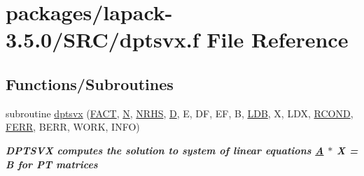 \hypertarget{dptsvx_8f}{}\section{packages/lapack-\/3.5.0/\+S\+R\+C/dptsvx.f File Reference}
\label{dptsvx_8f}
\subsection*{Functions/\+Subroutines}
\begin{DoxyCompactItemize}
\item 
subroutine \hyperlink{group__doublePTsolve_ga9584fd037291be2dff42741bb3215772}{dptsvx} (\hyperlink{superlu__enum__consts_8h_af00a42ecad444bbda75cde1b64bd7e72a1b6692b56d378abb85bd49063721d034}{F\+A\+C\+T}, \hyperlink{polmisc_8c_a0240ac851181b84ac374872dc5434ee4}{N}, \hyperlink{example__user_8c_aa0138da002ce2a90360df2f521eb3198}{N\+R\+H\+S}, \hyperlink{odrpack_8h_a7dae6ea403d00f3687f24a874e67d139}{D}, E, D\+F, E\+F, B, \hyperlink{example__user_8c_a50e90a7104df172b5a89a06c47fcca04}{L\+D\+B}, X, L\+D\+X, \hyperlink{superlu__enum__consts_8h_af00a42ecad444bbda75cde1b64bd7e72a9b5c151728d8512307565994c89919d5}{R\+C\+O\+N\+D}, \hyperlink{superlu__enum__consts_8h_af00a42ecad444bbda75cde1b64bd7e72a78fd14d7abebae04095cfbe02928f153}{F\+E\+R\+R}, B\+E\+R\+R, W\+O\+R\+K, I\+N\+F\+O)
\begin{DoxyCompactList}\small\item\em {\bfseries  D\+P\+T\+S\+V\+X computes the solution to system of linear equations \hyperlink{classA}{A} $\ast$ X = B for P\+T matrices} \end{DoxyCompactList}\end{DoxyCompactItemize}
